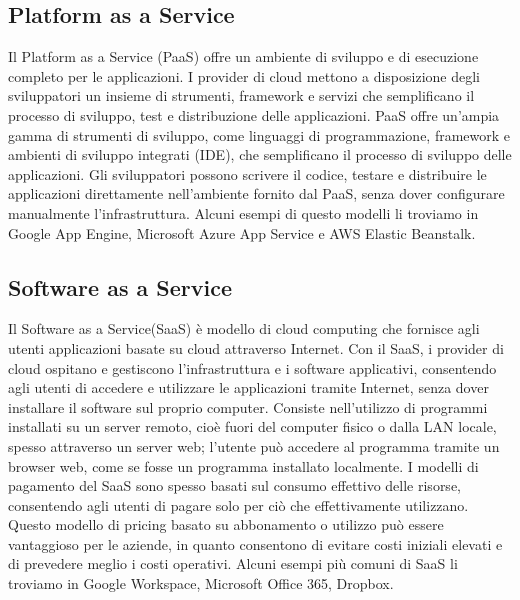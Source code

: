 \documentclass[../../main.tex]{subfiles}
\begin{document}
\subsection{Platform as a Service}
Il Platform as a Service (PaaS) offre un ambiente di sviluppo e di esecuzione completo per le applicazioni. I provider di cloud mettono a disposizione degli sviluppatori un insieme di strumenti, framework e servizi che semplificano il processo di sviluppo, test e distribuzione delle applicazioni.
PaaS offre un'ampia gamma di strumenti di sviluppo, come linguaggi di programmazione, framework e ambienti di sviluppo integrati (IDE), che semplificano il processo di sviluppo delle applicazioni. Gli sviluppatori possono scrivere il codice, testare e distribuire le applicazioni direttamente nell'ambiente fornito dal PaaS, senza dover configurare manualmente l'infrastruttura.
Alcuni esempi di questo modelli li troviamo in Google App Engine, Microsoft Azure App Service e AWS Elastic Beanstalk.

\subsection{Software as a Service}
Il Software as a Service(SaaS) è modello di cloud computing che fornisce agli utenti applicazioni basate su cloud attraverso Internet. Con il SaaS, i provider di cloud ospitano e gestiscono l'infrastruttura e i software applicativi, consentendo agli utenti di accedere e utilizzare le applicazioni tramite Internet, senza dover installare il software sul proprio computer.
Consiste nell'utilizzo di programmi installati su un server remoto, cioè fuori del computer fisico o dalla LAN locale, spesso attraverso un server web; l'utente può accedere al programma tramite un browser web, come se fosse un programma installato localmente.
I modelli di pagamento del SaaS sono spesso basati sul consumo effettivo delle risorse, consentendo agli utenti di pagare solo per ciò che effettivamente utilizzano. Questo modello di pricing basato su abbonamento o utilizzo può essere vantaggioso per le aziende, in quanto consentono di evitare costi iniziali elevati e di prevedere meglio i costi operativi.
Alcuni esempi più comuni di SaaS li troviamo in Google Workspace, Microsoft Office 365, Dropbox.
\end{document}
